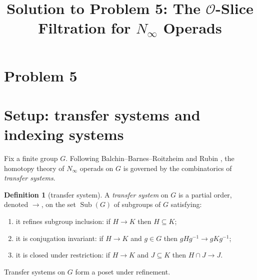 \clearpage
\section*{Problem 5}
\begingroup
\hypersetup{colorlinks=true,
            linkcolor=blue!50!black,
            citecolor=blue!50!black,
            urlcolor=blue!50!black}
\newcommand{\qfiveaO}{\mathcal{O}}
\newcommand{\qfiveSp}{\mathrm{Sp}}
\newcommand{\qfiveQ}{\mathbb{Q}}
\newcommand{\qfiveZ}{\mathbb{Z}}
\newcommand{\qfiveR}{\mathbb{R}}
\newcommand{\qfivegconn}{\operatorname{gconn}}
\newcommand{\qfiveconn}{\operatorname{conn}}
\newcommand{\qfiveSub}{\operatorname{Sub}}
\newcommand{\qfiveMap}{\operatorname{Map}}
\newcommand{\qfiveEP}{\widetilde{E\mathcal P}}
\newtheorem{qfivetheorem}{Theorem}
\newtheorem{qfivelemma}{Lemma}
\newtheorem{qfiveproposition}{Proposition}
\newtheorem{qfivecorollary}{Corollary}
\theoremstyle{definition}
\newtheorem{qfivedefinition}{Definition}
\newtheorem{qfiveremark}{Remark}
\title{Solution to Problem 5: The $\qfiveaO$-Slice Filtration for $N_\infty$ Operads}
\author{}
\date{}
\maketitle


\section*{Setup: transfer systems and indexing systems}

Fix a finite group $G$. Following Balchin--Barnes--Roitzheim \cite{BBR} and
Rubin \cite{Rubin}, the homotopy theory of $N_\infty$ operads on $G$ is governed
by the combinatorics of \emph{transfer systems}.

\begin{qfivedefinition}[transfer system]
A \emph{transfer system} on $G$ is a partial order, denoted $\to$, on the set
$\qfiveSub(G)$ of subgroups of $G$ satisfying:
\begin{enumerate}\setlength\itemsep{2pt}
\item it refines subgroup inclusion: if $H\to K$ then $H\subseteq K$;
\item it is conjugation invariant: if $H\to K$ and $g\in G$ then
$gHg^{-1}\to gKg^{-1}$;
\item it is closed under restriction: if $H\to K$ and $J\subseteq K$ then
$H\cap J\to J$.
\end{enumerate}
Transfer systems on $G$ form a poset under refinement.
\end{qfivedefinition}

